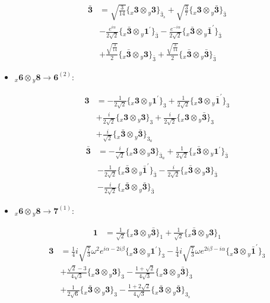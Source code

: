 \documentclass[english]{article}
\newcommand{\rep}[1]{\mathbf{#1}}
\newcommand{\repx}[2]{{}_{#2}\mathbf{#1}}
\newcommand{\tsprodx}[2]{\repx{#1}{x}\otimes\repx{#2}{y}}
\newcommand{\subcgt}[3]{\big\{ \tsprodx{#1}{#2}\big\}^{}_{#3}}
\begin{document}
\begin{itemize}
\begin{fleqn}
\begin{align*}
\rep{\bar{3}} & = \sqrt{\frac{3}{14}}\subcgt{3}{3}{\bar{3}_{s}}+\sqrt{\frac{3}{7}}\subcgt{3}{\bar{3}}{\bar{3}} \\ 
 & -\frac{e^{i \alpha }}{2 \sqrt{2}}\subcgt{\bar{3}}{1^{\prime}}{\bar{3}}-\frac{e^{-i \alpha }}{2 \sqrt{2}}\subcgt{\bar{3}}{\bar{1}^{\prime}}{\bar{3}} \\ 
 & +\frac{\sqrt{\frac{3}{14}}}{2}\subcgt{\bar{3}}{3}{\bar{3}}+\frac{\sqrt{\frac{3}{14}}}{2}\subcgt{\bar{3}}{\bar{3}}{\bar{3}}
\end{align*}
\end{fleqn}
\item $\tsprodx{6}{8}\to\rep{6}^{(2)}$:
\begin{fleqn}
\begin{align*}
\rep{3} & = -\frac{1}{2 \sqrt{2}}\subcgt{3}{1^{\prime}}{3}+\frac{1}{2 \sqrt{2}}\subcgt{3}{\bar{1}^{\prime}}{3} \\ 
 & +\frac{i}{2 \sqrt{2}}\subcgt{3}{3}{3}+\frac{i}{2 \sqrt{2}}\subcgt{3}{\bar{3}}{3} \\ 
 & +\frac{i}{\sqrt{2}}\subcgt{\bar{3}}{\bar{3}}{3_{a}}
\end{align*}
\begin{align*}
\rep{\bar{3}} & = -\frac{i}{\sqrt{2}}\subcgt{3}{3}{\bar{3}_{a}}+\frac{1}{2 \sqrt{2}}\subcgt{\bar{3}}{1^{\prime}}{\bar{3}} \\ 
 & -\frac{1}{2 \sqrt{2}}\subcgt{\bar{3}}{\bar{1}^{\prime}}{\bar{3}}-\frac{i}{2 \sqrt{2}}\subcgt{\bar{3}}{3}{\bar{3}} \\ 
 & -\frac{i}{2 \sqrt{2}}\subcgt{\bar{3}}{\bar{3}}{\bar{3}}
\end{align*}
\end{fleqn}
\item $\tsprodx{6}{8}\to\rep{7}^{(1)}$:
\begin{fleqn}
\begin{align*}
\rep{1} & = \frac{1}{\sqrt{2}}\subcgt{3}{\bar{3}}{1}+\frac{1}{\sqrt{2}}\subcgt{\bar{3}}{3}{1}
\end{align*}
\begin{align*}
\rep{3} & = \frac{1}{4} i \sqrt{\frac{7}{3}} \omega ^2 e^{i \alpha -2 i \beta }\subcgt{3}{1^{\prime}}{3}-\frac{1}{4} i \sqrt{\frac{7}{3}} \omega  e^{2 i \beta -i \alpha }\subcgt{3}{\bar{1}^{\prime}}{3} \\ 
 & +\frac{\sqrt{2}-3}{4 \sqrt{3}}\subcgt{3}{3}{3}-\frac{1+\sqrt{2}}{4 \sqrt{3}}\subcgt{3}{\bar{3}}{3} \\ 
 & +\frac{1}{2 \sqrt{6}}\subcgt{\bar{3}}{3}{3}-\frac{1+2 \sqrt{2}}{4 \sqrt{3}}\subcgt{\bar{3}}{\bar{3}}{3_{s}} \\ 

\end{align*}
\end{fleqn}
\end{itemize}
\end{document}
